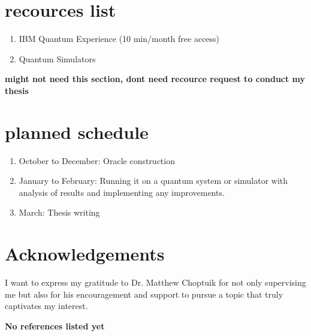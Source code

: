 \documentclass[twocolumn,showpacs,preprintnumbers,amsmath,amssymb]{revtex4}
\begin{document}
		
		
		\section{recources list}
		\begin{enumerate}
			\item IBM Quantum Experience (10 min/month free access)
			\item Quantum Simulators
		\end{enumerate}
		
		\textbf{might not need this section, dont need recource request to conduct my thesis}
		\section{planned schedule}
		
		
		\begin{enumerate}
			\item October to December:  Oracle construction
			\item January to February:  Running it on a quantum system or simulator with analysis of results and implementing any improvements.
			\item  March: Thesis writing
		\end{enumerate}
		
		
		
		\section{Acknowledgements}
		
		I want to express my gratitude to Dr. Matthew Choptuik for not only supervising me but also 
		for his encouragement and support to pursue a topic that truly captivates my interest.
		
		\begin{thebibliography}{99}
			
			\textbf{No references listed yet}
			
		\end{thebibliography}
		
		
	
\end{document}
